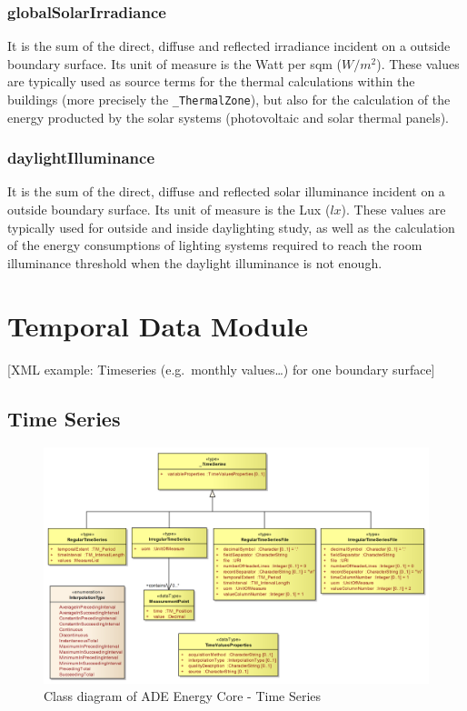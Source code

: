 \documentclass[a4paper,12pt]{article}
\let\stdsection\section%
\renewcommand\section{\newpage\stdsection}
\begin{document}
\subsubsection{globalSolarIrradiance}\label{globalsolarirradiance}

It is the sum of the direct, diffuse and reflected irradiance incident
on a outside boundary surface. Its unit of measure is the Watt per sqm
(\(W/m^2\)). These values are typically used as source terms for the
thermal calculations within the buildings (more precisely the
\texttt{\_ThermalZone}), but also for the calculation of the energy
producted by the solar systems (photovoltaic and solar thermal panels).

\subsubsection{daylightIlluminance}\label{daylightilluminance}

It is the sum of the direct, diffuse and reflected solar illuminance
incident on a outside boundary surface. Its unit of measure is the Lux
(\(lx\)). These values are typically used for outside and inside
daylighting study, as well as the calculation of the energy consumptions
of lighting systems required to reach the room illuminance threshold
when the daylight illuminance is not enough.

\section{Temporal Data Module}\label{temporal-data-module}

{[}XML example: Timeseries (e.g.~monthly values\ldots{}) for one
boundary surface{]}

\subsection{Time Series}\label{time-series}

\begin{figure}[htbp]
\centering
\includegraphics{fig/class_time.png}
\caption{Class diagram of ADE Energy Core - Time Series}
\end{figure}
\end{document}
